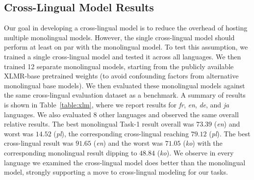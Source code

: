 \documentclass[letterpaper]{article} %
\begin{document}
\subsection*{Cross-Lingual Model Results}
Our goal in developing a cross-lingual model is to reduce the overhead of hosting multiple monolingual models.
However, the single cross-lingual model should perform at least on par with the monolingual model.
To test this assumption, we trained a single cross-lingual model and tested it across all languages.
We then trained 12 separate monolingual models, starting from the publicly available XLMR-base pretrained weights (to avoid confounding factors from alternative monolingual base models).
We then evaluated these monolingual models against the same cross-lingual evaluation dataset as a benchmark.
A summary of results is shown in Table~\ref{table:xlm}, where we report results for \emph{fr}, \emph{en}, \emph{de}, and \emph{ja} languages. 
We also evaluated 8 other languages and observed the same overall relative results. 
The best monolingual Task-1 result overall was $73.39$ (\emph{en}) and worst was $14.52$ (\emph{pl}), the corresponding cross-lingual reaching $79.12$ (\emph{pl}). 
The best cross-lingual result was $91.65$ (\emph{en}) and the worst was $71.05$ (\emph{ko}) with the corresponding monolingual result dipping to $48.84$ (\emph{ko}).
We observe in every language we examined the cross-lingual model does better than the monolingual model, strongly supporting a move to cross-lingual modeling for our tasks.


\begin{table}[!htb]
\centering
\renewcommand{\arraystretch}{1.1}
\caption{Cross-lingual model comparison with monolingual models, evaluated on the same target language.  Across all languages and tasks we evaluated, we observed the cross-lingual models to outperform monolingual models.}
\label{table:xlm}
\end{table}
\end{document}
